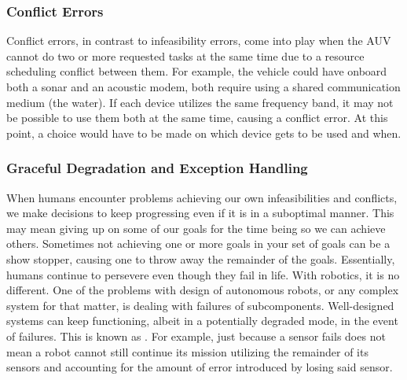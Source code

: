 \subsubsection{Conflict Errors}
Conflict errors, in contrast to infeasibility errors, come into play when the AUV cannot do two or more requested tasks at the same time due to a resource scheduling conflict between them. For example, the vehicle could have onboard both a sonar and an acoustic modem, both require using a shared communication medium (the water). If each device utilizes the same frequency band, it may not be possible to use them both at the same time, causing a conflict error. At this point, a choice would have to be made on which device gets to be used and when.

\subsubsection{Graceful Degradation and Exception Handling}
When humans encounter problems achieving our own infeasibilities and conflicts, we make decisions to keep progressing even if it is in a suboptimal manner. This may mean giving up on some of our goals for the time being so we can achieve others. Sometimes not achieving one or more goals in your set of goals can be a show stopper, causing one to throw away the remainder of the goals. Essentially, humans continue to persevere even though they fail in life. With robotics, it is no different. One of the problems with design of autonomous robots, or any complex system for that matter, is dealing with failures of subcomponents. Well-designed systems can keep functioning, albeit in a potentially degraded mode, in the event of failures. This is known as . For example, just because a sensor fails does not mean a robot cannot still continue its mission utilizing the remainder of its sensors and accounting for the amount of error introduced by losing said sensor.

